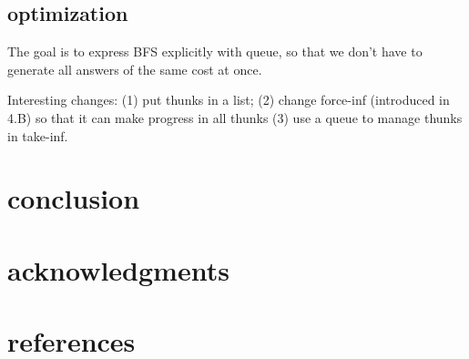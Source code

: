 \documentclass[format=acmlarge, review=true, authordraft=true]{acmart}
\begin{document}
\subsection{optimization}

The goal is to express BFS explicitly with queue, so that we don’t have to generate all answers of the same cost at once.

Interesting changes: (1) put thunks in a list; (2) change force-inf (introduced in 4.B) so that it can make progress in all thunks (3) use a queue to manage thunks in take-inf.

\section{conclusion}

\section*{acknowledgments}

\section*{references}
\end{document}
